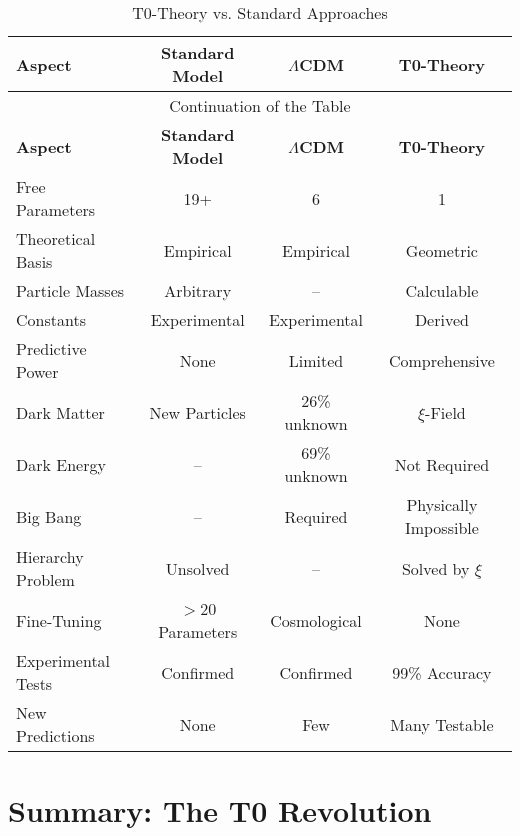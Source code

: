 \documentclass[12pt,a4paper]{article}
\begin{document}
	\begin{center}
		\begin{longtable}{lccc}
			\caption{T0-Theory vs. Standard Approaches} \\
			\toprule
			\textbf{Aspect} & \textbf{Standard Model} & \textbf{$\Lambda$CDM} & \textbf{T0-Theory} \\
			\midrule
			\endfirsthead
			\multicolumn{4}{c}{Continuation of the Table} \\
			\toprule
			\textbf{Aspect} & \textbf{Standard Model} & \textbf{$\Lambda$CDM} & \textbf{T0-Theory} \\
			\midrule
			\endhead
			\bottomrule
			\endlastfoot
			
			Free Parameters & 19+ & 6 & 1 \\
			Theoretical Basis & Empirical & Empirical & Geometric \\
			Particle Masses & Arbitrary & -- & Calculable \\
			Constants & Experimental & Experimental & Derived \\
			Predictive Power & None & Limited & Comprehensive \\
			Dark Matter & New Particles & 26\% unknown & $\xi$-Field \\
			Dark Energy & -- & 69\% unknown & Not Required \\
			Big Bang & -- & Required & Physically Impossible \\
			Hierarchy Problem & Unsolved & -- & Solved by $\xi$ \\
			Fine-Tuning & $>$20 Parameters & Cosmological & None \\
			Experimental Tests & Confirmed & Confirmed & 99\% Accuracy \\
			New Predictions & None & Few & Many Testable \\
		\end{longtable}
	\end{center}
	
	\section{Summary: The T0 Revolution}
	
\end{document}
